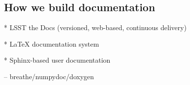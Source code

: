 \subsection{How we build documentation}

* LSST the Docs (versioned, web-based, continuous delivery)

* LaTeX documentation system

* Sphinx-based user documentation

-- breathe/numpydoc/doxygen
